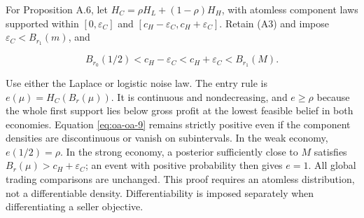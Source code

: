 For Proposition A.6, let \(H_C=\rho H_L+(1-\rho)H_H\), with atomless
component laws supported within
\([0,\varepsilon_C]\) and
\([c_H-\varepsilon_C,c_H+\varepsilon_C]\). Retain (A3) and impose
\(\varepsilon_C<B_{r_1}(m)\), and

\[
B_{r_0}(1/2)<c_H-\varepsilon_C<c_H+\varepsilon_C<B_{r_1}(M).
\tag{OA.26}\label{eq:oa-oa-26}
\]

Use either the Laplace or logistic noise law. The entry rule is
\(e(\mu)=H_C(B_r(\mu))\). It is continuous and nondecreasing, and
\(e\ge\rho\) because the whole first support lies below gross profit at the
lowest feasible belief in both economies. Equation
\eqref{eq:oa-oa-9} remains strictly positive even if the component
densities are discontinuous or vanish on subintervals. In the weak
economy, \(e(1/2)=\rho\). In the strong economy, a posterior
sufficiently close to \(M\) satisfies \(B_r(\mu)>c_H+\varepsilon_C\); an
event with positive probability then gives \(e=1\). All global trading
comparisons are unchanged. This proof requires an atomless distribution,
not a differentiable density. Differentiability is imposed separately
when differentiating a seller objective.
